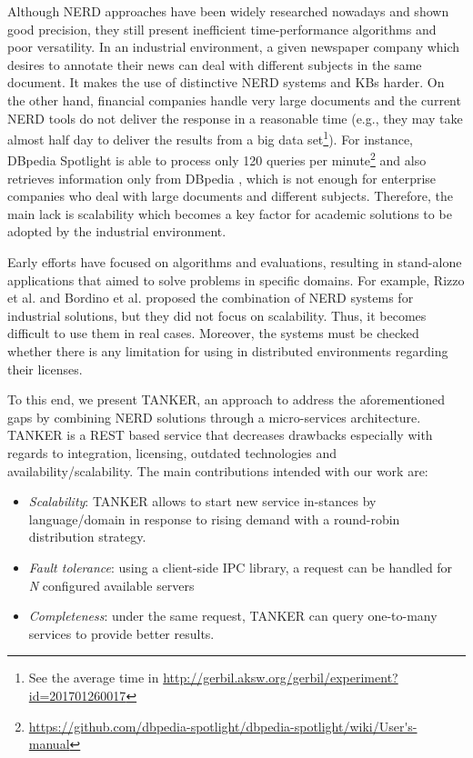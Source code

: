 \documentclass{sig-alternate}
\begin{document}
Although NERD approaches have been widely researched nowadays and shown good precision, they still present inefficient time-performance algorithms and poor versatility. In an industrial environment, a given newspaper company which desires to annotate their news can deal with different subjects in the same document. It makes the use of distinctive NERD systems and KBs harder. On the other hand, financial companies handle very large documents and the current NERD tools do not deliver the response in a reasonable time (e.g., they may take almost half day to deliver the results from a big data set\footnote{ See the average time in \url{http://gerbil.aksw.org/gerbil/experiment?id=201701260017}}). For instance, DBpedia Spotlight \cite{_Ref490759726} is able to process only 120 queries per minute\footnote{\url{https://github.com/dbpedia-spotlight/dbpedia-spotlight/wiki/User's-manual}} and also retrieves information only from DBpedia \cite{_Ref490759734}, which is not enough for enterprise companies who deal with large documents and different subjects. Therefore, the main lack is scalability which becomes a key factor for academic solutions to be adopted by the industrial environment.

Early efforts have focused on algorithms and evaluations, resulting in stand-alone applications that aimed to solve problems in specific domains. For example, Rizzo et al.  \cite{_Ref490759749} and Bordino et al.  \cite{_Ref490759761} proposed the combination of NERD systems for industrial solutions, but they did not focus on scalability. Thus, it becomes difficult to use them in real cases. Moreover, the systems must be checked whether there is any limitation for using in distributed environments regarding their licenses.

To this end, we present TANKER, an approach to address the aforementioned gaps by combining NERD solutions through a micro-services architecture. TANKER is a REST based service that decreases drawbacks especially with regards to integration, licensing, outdated technologies and availability/scalability. The main contributions intended with our work are:
\begin{itemize}
\item {\em Scalability}: TANKER allows to start new service in-stances by language/domain in response to rising demand with a round-robin distribution strategy.
\item {\em Fault tolerance}: using a client-side IPC library, a request can be handled for {\em N} configured available servers
\item {\em Completeness}: under the same request, TANKER can query one-to-many services to provide better results.
\end{itemize}
\end{document}

